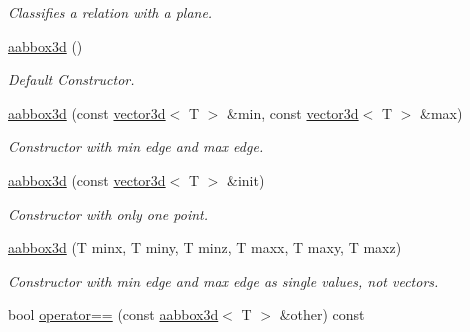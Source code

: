 \begin{DoxyCompactItemize}
\begin{DoxyCompactList}\small\item\em Classifies a relation with a plane. \end{DoxyCompactList}\item 
\mbox{\label{classirr_1_1core_1_1aabbox3d_aec7f681b248d9f0e07d62be0c921767e}} 
\hyperlink{classirr_1_1core_1_1aabbox3d_aec7f681b248d9f0e07d62be0c921767e}{aabbox3d} ()
\begin{DoxyCompactList}\small\item\em Default Constructor. \end{DoxyCompactList}\item 
\mbox{\label{classirr_1_1core_1_1aabbox3d_a7281018221a7c1070a5487cb98f2ac45}} 
\hyperlink{classirr_1_1core_1_1aabbox3d_a7281018221a7c1070a5487cb98f2ac45}{aabbox3d} (const \hyperlink{classirr_1_1core_1_1vector3d}{vector3d}$<$ T $>$ \&min, const \hyperlink{classirr_1_1core_1_1vector3d}{vector3d}$<$ T $>$ \&max)
\begin{DoxyCompactList}\small\item\em Constructor with min edge and max edge. \end{DoxyCompactList}\item 
\mbox{\label{classirr_1_1core_1_1aabbox3d_a1e1b49cb756eab5ba6dec051a6fa27c8}} 
\hyperlink{classirr_1_1core_1_1aabbox3d_a1e1b49cb756eab5ba6dec051a6fa27c8}{aabbox3d} (const \hyperlink{classirr_1_1core_1_1vector3d}{vector3d}$<$ T $>$ \&init)
\begin{DoxyCompactList}\small\item\em Constructor with only one point. \end{DoxyCompactList}\item 
\mbox{\label{classirr_1_1core_1_1aabbox3d_af73ac9adeaae3abf8afaeb5f6be4a52c}} 
\hyperlink{classirr_1_1core_1_1aabbox3d_af73ac9adeaae3abf8afaeb5f6be4a52c}{aabbox3d} (T minx, T miny, T minz, T maxx, T maxy, T maxz)
\begin{DoxyCompactList}\small\item\em Constructor with min edge and max edge as single values, not vectors. \end{DoxyCompactList}\item 
bool \hyperlink{classirr_1_1core_1_1aabbox3d_ac77180d63cc1726d0dec25e6f4cfd59c}{operator==} (const \hyperlink{classirr_1_1core_1_1aabbox3d}{aabbox3d}$<$ T $>$ \&other) const

\end{DoxyCompactItemize}
